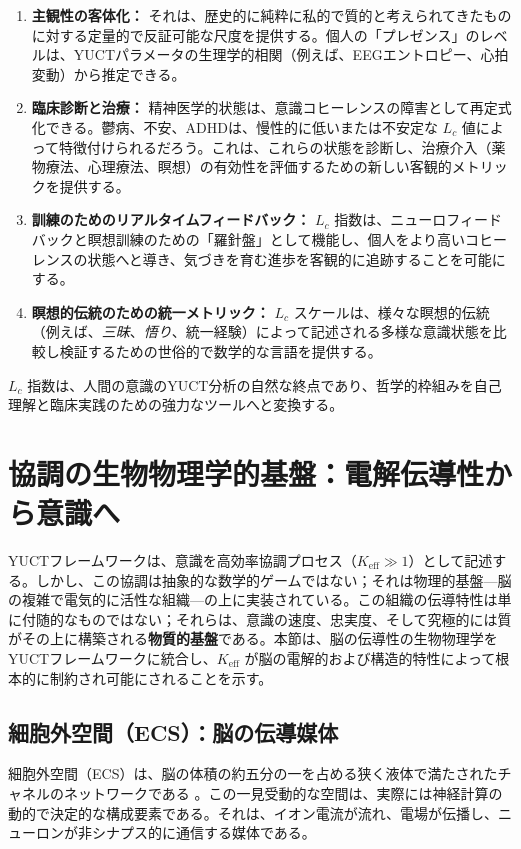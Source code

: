 \documentclass[12pt,a4paper]{article}
\begin{document}
	\begin{enumerate}
		\item \textbf{主観性の客体化：} それは、歴史的に純粋に私的で質的と考えられてきたものに対する定量的で反証可能な尺度を提供する。個人の「プレゼンス」のレベルは、YUCTパラメータの生理学的相関（例えば、EEGエントロピー、心拍変動）から推定できる。
		\item \textbf{臨床診断と治療：} 精神医学的状態は、意識コヒーレンスの障害として再定式化できる。鬱病、不安、ADHDは、慢性的に低いまたは不安定な \(L_c\) 値によって特徴付けられるだろう。これは、これらの状態を診断し、治療介入（薬物療法、心理療法、瞑想）の有効性を評価するための新しい客観的メトリックを提供する。
		\item \textbf{訓練のためのリアルタイムフィードバック：} \(L_c\) 指数は、ニューロフィードバックと瞑想訓練のための「羅針盤」として機能し、個人をより高いコヒーレンスの状態へと導き、気づきを育む進歩を客観的に追跡することを可能にする。
		\item \textbf{瞑想的伝統のための統一メトリック：} \(L_c\) スケールは、様々な瞑想的伝統（例えば、\textit{三昧}、\textit{悟り}、統一経験）によって記述される多様な意識状態を比較し検証するための世俗的で数学的な言語を提供する。
	\end{enumerate}
	
	\(L_c\) 指数は、人間の意識のYUCT分析の自然な終点であり、哲学的枠組みを自己理解と臨床実践のための強力なツールへと変換する。
	
	\section{協調の生物物理学的基盤：電解伝導性から意識へ}
	
	YUCTフレームワークは、意識を高効率協調プロセス（\(K_{\mathrm{eff}} \gg 1\)）として記述する。しかし、この協調は抽象的な数学的ゲームではない；それは物理的基盤—脳の複雑で電気的に活性な組織—の上に実装されている。この組織の伝導特性は単に付随的なものではない；それらは、意識の速度、忠実度、そして究極的には質がその上に構築される\textbf{物質的基盤}である。本節は、脳の伝導性の生物物理学をYUCTフレームワークに統合し、\(K_{\mathrm{eff}}\) が脳の電解的および構造的特性によって根本的に制約され可能にされることを示す。
	
	\subsection{細胞外空間（ECS）：脳の伝導媒体}
	
	細胞外空間（ECS）は、脳の体積の約五分の一を占める狭く液体で満たされたチャネルのネットワークである \cite{Nicholson2006}。この一見受動的な空間は、実際には神経計算の動的で決定的な構成要素である。それは、イオン電流が流れ、電場が伝播し、ニューロンが非シナプス的に通信する媒体である。
	
\end{document}
